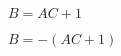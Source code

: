 \documentclass[12pt, a4paper, addpoints]{exam}
\newcommand{\verticalspace}{\vspace{26mm}} %
\begin{document}
\begin{questions}
\question   $B=AC+1$ 
\setlength{\columnsep}{20pt}
\begin{multicols}{3}
\end{multicols}

\question   $B=-(AC+1)$ 
\setlength{\columnsep}{20pt}
\begin{multicols}{3}
\end{multicols}










\end{questions}
\end{document}

